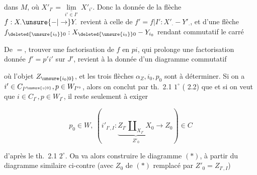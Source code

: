 dans $M$, où $X'_{I'}=\underset{i'\in I'}{\underline{\lim}}\,X'_{i'}$. Donc la donnée de la flèche $f:X_{\cdot}\unsure{\mathbin{-}|\to}Y_{\cdot}$ revient à celle de $f'=f|I':X'_{\cdot}\mathbin{-}Y'_{\cdot}$, et d'une flèche $f_{\deleted{\unsure{i_0}}0}:X_{\deleted{\unsure{i_0}}0}\mathbin{-}Y_{i_0}$ rendant commutatif le carré


De $=$, trouver une factorisation de $f$ en $pi$, qui prolonge une factorisation donnée $f'=p'i'$ sur $J'$, revient à la donnée d'un diagramme commutatif


où l'objet $Z_{\unsure{i_0|0}}$, et les trois flèches $\alpha_Z,i_0,p_0$ sont à déterminer. Si on a $i'\in C_{I'^{\unsure{\circ|0}}},p\in W_{I'^\circ}$, alors on conclut par th.~2.1 $1^\circ$ ( 2.2) que  et si on veut que $i\in C_{I^\circ},p\in W_{I^\circ}$, il reste seulement à exiger 

\[
 p_0\in W,\ (i'_{I',I}:\underbrace{Z_{I'}\amalg_{X_{I'}}X_0}_{Z'_0}\longrightarrow Z_0)\in C
\]

d'après le th.~2.1 $2^\circ$. On va alors construire le diagramme $(*)$, à partir du diagramme similaire ci-contre (avec $Z_0$ de $(*)$ remplacé par $Z'_0=Z_{I',I}$)


